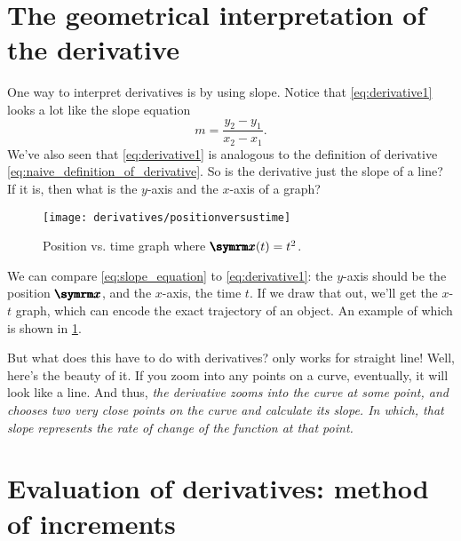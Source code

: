 \section{The geometrical interpretation of the derivative}

One way to interpret derivatives is by using slope. Notice that \cref{eq:derivative1} looks a lot like the slope equation
\begin{equation}
    m = \frac{y_2 - y_1}{x_2 - x_1}. \label{eq:slope_equation}
\end{equation}
We've also seen that \cref{eq:derivative1} is analogous to the definition of derivative \cref{eq:naive_definition_of_derivative}. So is the derivative just the slope of a line? If it is, then what is the $y$-axis and the $x$-axis of a graph?

\begin{wrapfigure}[10]{l}{0.43\textwidth}
        \centering
        \texttt{[image: derivatives/positionversustime]}
        \caption{Position vs. time graph where $\protect\vv{x}(t) = t^2$.}
        \label{fig:position_versus_time}
\end{wrapfigure}

We can compare \cref{eq:slope_equation} to \cref{eq:derivative1}: the $y$-axis should be the position $\vv{x}$, and the $x$-axis, the time $t$. If we draw that out, we'll get the $x$-$t$ graph, which can encode the exact trajectory of an object. An example of which is shown in \cref{fig:position_versus_time}.

But what does this have to do with derivatives?  only works for straight line! Well, here's the beauty of it. If you zoom into any points on a curve, eventually, it will look like a line. And thus, \emph{the derivative zooms into the curve at some point, and chooses two very close points on the curve and calculate its slope. In which, that slope represents the rate of change of the function at that point.}

\section{Evaluation of derivatives: method of increments}

